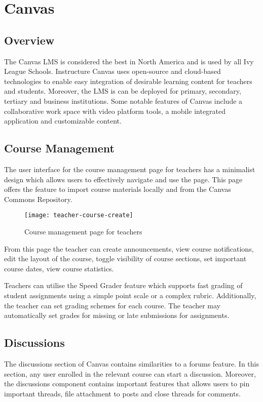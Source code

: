 \section{Canvas}

\subsection{Overview}
The Canvas LMS is considered the best in North America and is used by all Ivy League Schools\cite{canvasLMS}. Instructure 
Canvas uses open-source and cloud-based technologies to enable easy integration of desirable learning content 
for teachers and students. Moreover, the LMS is can be deployed for primary, secondary, tertiary and business 
institutions. Some notable features of Canvas include a collaborative work space with video platform tools, a 
mobile integrated application and customizable content.

\subsection{Course Management}
The user interface for the course management page for teachers has a minimalist design which allows users to 
effectively navigate and use the page. This page offers the feature to import course materials locally and 
from the Canvas Commons Repository.

\begin{figure}[h!]
\texttt{[image: teacher-course-create]}
\centering
\caption{Course management page for teachers}
\end{figure}

From this page the teacher can create announcements, view course notifications, edit the layout of the course, toggle 
visibility of course sections, set important course dates, view course statistics.

Teachers can utilise the Speed Grader feature which supports fast grading of student assignments using a simple point 
scale or a complex rubric. Additionally, the teacher can set grading schemes for each course. The teacher may 
automatically set grades for missing or late submissions for assignments. 

\subsection{Discussions}
The discussions section of Canvas contains similarities to a forums feature. In this section, any user enrolled in 
the relevant course can start a discussion. Moreover, the discussions component contains important features that 
allows users to pin important threads, file attachment to posts and close threads for comments.


